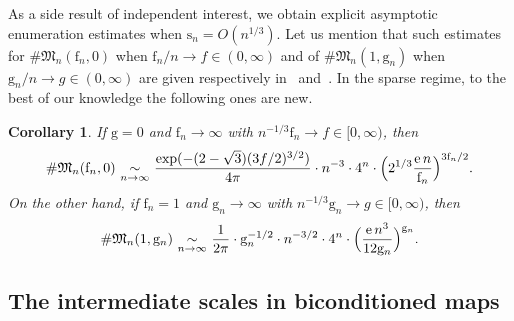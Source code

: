 \documentclass[11pt]{article}
\theoremstyle{plain}
\newtheorem{corollary}[theorem]{Corollary}
\theoremstyle{definition}
\theoremstyle{remark}
\newcommand{\e}{\operatorname{e}}
\newcommand{\face}{\mathrm{f}}
\newcommand{\gen}{\mathrm{g}}
\newcommand{\spar}{\mathrm{s}}
\newcommand{\equi}[1][n]{\,\mathop{\sim}^{}_{#1 \to \infty}\,}
\begin{document}
As a side result of independent interest, we obtain explicit asymptotic enumeration estimates when $\spar_n= O(n^{1/3})$. Let us mention that such estimates for $\# \mathfrak{M}_{n}(\face_{n},0)$ when $\face_{n}/n \rightarrow f \in (0,\infty)$ and of $\# \mathfrak{M}_{n}(1,\gen_{n})$ when $\gen_{n}/n \rightarrow g \in (0,\infty)$ are given respectively in~\cite[Th.\,1]{BCR93} and~\cite[Th.\,3]{ACCR13}. In the sparse regime, to the best of our knowledge the following ones are new.

\begin{corollary}
\label{cor:enumeration}
If $\gen=0$ and $\face_n \to \infty$ with $n^{-1/3} \face_n \to f \in [0,\infty)$, then
\[
\# \mathfrak{M}_n(\face_n,0)
\equi \frac{\exp(-(2-\sqrt{3}) (3f/2)^{3/2})}{4 \pi} \cdot n^{-3} \cdot 4^{n} \cdot \Bigl(2^{1/3} \frac{\e n}{\face_{n}}\Bigr)^{3\face_{n}/2}.
\]
On the other hand, if $\face_n=1$ and $\gen_n \to \infty$ with $n^{-1/3} \gen_n \to g \in [0,\infty)$, then
\[
\# \mathfrak{M}_n(1,\gen_n)
\equi \frac{1}{2\pi } \cdot \gen_n^{-1/2} \cdot n^{-3/2} \cdot 4^{n} \cdot \Bigl(\frac{\e n^3}{12 \gen_n}\Bigr)^{\gen_n}.
\]
\end{corollary}

\subsection{The intermediate scales in biconditioned maps}
\end{document}
